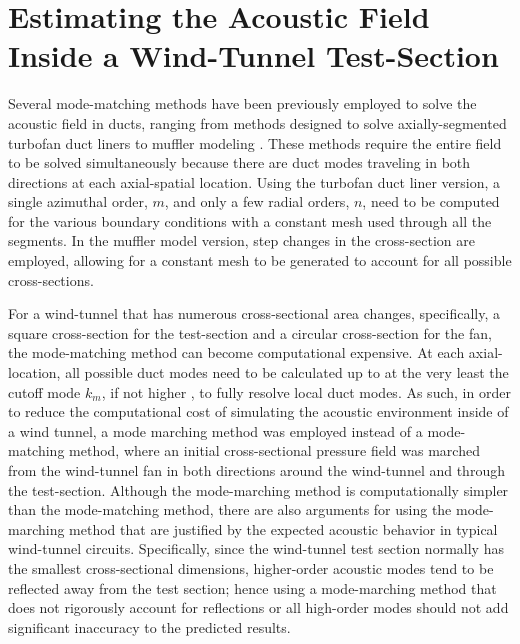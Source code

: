 \section{Estimating the Acoustic Field Inside a Wind-Tunnel Test-Section}
\label{sect:03_test_section}
Several mode-matching methods have been previously employed to solve the acoustic field in ducts, ranging from methods designed to solve axially-segmented turbofan duct liners \cite{McAlpine-2006-NrCzhW4Z} to muffler modeling \cite{Ji-2013-agaCHhcP}.
These methods require the entire field to be solved simultaneously because there are duct modes traveling in both directions at each axial-spatial location.
Using the turbofan duct liner version, a single azimuthal order, $m$, and only a few radial orders, $n$, need to be computed for the various boundary conditions with a constant mesh used through all the segments.
In the muffler model version, step changes in the cross-section are employed, allowing for a constant mesh to be generated to account for all possible cross-sections.

For a wind-tunnel that has numerous cross-sectional area changes, specifically, a square cross-section for the test-section and a circular cross-section for the fan, the mode-matching method can become computational expensive.
At each axial-location, all possible duct modes need to be calculated up to at the very least the cutoff mode $k_m$, if not higher \cite{Gabard-2008-H4mEEeVt}, to fully resolve local duct modes.
As such, in order to reduce the computational cost of simulating the acoustic environment inside of a wind tunnel, a mode marching method was employed instead of a mode-matching method, where an initial cross-sectional pressure field was marched from the wind-tunnel fan in both directions around the wind-tunnel and through the test-section.
Although the mode-marching method is computationally simpler than the mode-matching method, there are also arguments for using the mode-marching method that are justified by the expected acoustic behavior in typical wind-tunnel circuits.
Specifically, since the wind-tunnel test section normally has the smallest cross-sectional dimensions, higher-order acoustic modes tend to be reflected away from the test section; hence using a mode-marching method that does not rigorously account for reflections or all high-order modes should not add significant inaccuracy to the predicted results.

